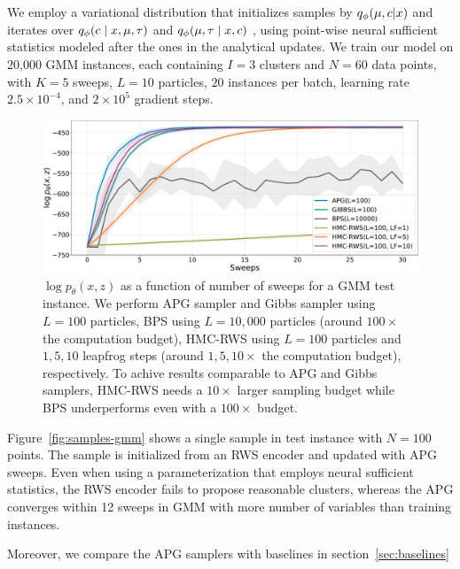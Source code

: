 \documentclass{article}
\theoremstyle{definition}
\begin{document}
We employ a variational distribution that initializes samples by $q_\phi(\mu, c | x)$ and iterates over $q_\phi(c \mid x, \mu, \tau)$ and $q_\phi(\mu, \tau \mid x, c)$ , using point-wise neural sufficient statistics modeled after the ones in the analytical updates.
We train our model on 20,000 GMM instances, each containing $I = 3$ clusters and $N = 60$ data points, with $K=5$ sweeps, $L=10$ particles, $20$ instances per batch, learning rate $2.5\times10^{-4}$, and $2\times10^5$ gradient steps.
\begin{figure}[t!]
\centering
\includegraphics[width=\columnwidth]{figures/convergence_gmm_v2.pdf}
  \caption{$\log p_\theta(x, z)$ as a function of number of sweeps for a GMM test instance. We perform APG sampler and Gibbs sampler using $L=100$ particles, BPS using $L=10,000$ particles (around $100\times$ the computation budget), HMC-RWS using $L=100$ particles and $1, 5, 10$ leapfrog steps (around $1, 5, 10\times$ the computation budget), respectively. To achive results comparable to APG and Gibbs samplers, HMC-RWS needs a $10\times$ larger sampling budget while BPS underperforms even with a $100\times$ budget.}
  \label{fig:convergence-gmm}
\end{figure}

Figure~\ref{fig:samples-gmm} shows a single sample in test instance with $N=100$ points. The sample is initialized from an RWS encoder and updated with APG sweeps. Even when using a parameterization that employs neural sufficient statistics, the RWS encoder fails to propose reasonable clusters, whereas the APG converges within 12 sweeps in GMM with more number of variables than training instances.

Moreover, we compare the APG samplers with baselines in section~\ref{sec:baselines}
\end{document}
